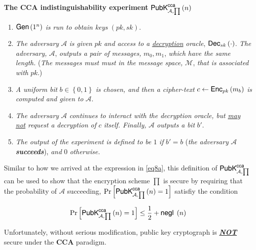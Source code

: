 \documentclass[../CryptoHW3.tex]{subfiles}
\begin{document}
\begin{flushleft}
\textbf{The CCA indistinguishability experiment} $\text{{\fontfamily{phv}\selectfont PubK}}^{\text{{\fontfamily{phv}\selectfont cca}}}_{\mathcal{A}, \prod} \left( n \right)$

\begin{enumerate}
  \item $\text{{\fontfamily{phv}\selectfont Gen}} \left( 1^n \right)$ \emph{is run to obtain keys} $\left( pk, sk \right)$.
  \item \emph{The adversary} $\mathcal{A}$ \emph{is given} $pk$ \emph{and access to a \underline{decryption} oracle}, $\text{{\fontfamily{phv}\selectfont Dec}}_{sk} \left( \cdot \right)$.  \emph{The adversary,} $\mathcal{A}$, \emph{outputs a pair of messages,} $m_0, m_1$, \emph{which have the same length.} (\emph{The messages must must in the message space,} $\mathcal{M}$, \emph{that is associated with} $pk$.)
  \item \emph{A uniform bit} $b \in \left\{ 0, 1 \right\}$ \emph{is chosen, and then a cipher-text} $c \leftarrow \text{{\fontfamily{phv}\selectfont Enc}}_{pk} \left( m_b \right)$ \emph{is computed and given to} $\mathcal{A}$.
  \item \emph{The adversary} $\mathcal{A}$ \emph{continues to interact with the decryption oracle, but \underline{may not} request a decryption of} $c$ \emph{itself.  Finally,} $\mathcal{A}$ \emph{outputs a bit} $b'$.
  \item \emph{The output of the experiment is defined to be} $1$ \emph{if} $b' = b$ (\emph{the adversary} $\mathcal{A}$ \textbf{\emph{succeeds}}), \emph{and} $0$ \emph{otherwise.}
\end{enumerate}

Similar to how we arrived at the expression in \ref{eq8a}, this definition of $\text{{\fontfamily{phv}\selectfont PubK}}^{\text{{\fontfamily{phv}\selectfont cca}}}_{\mathcal{A}, \prod}$ can be used to show that the encryption scheme $\prod$ is secure by requiring that the probability of $\mathcal{A}$ succeeding, $\Pr \left[ \text{{\fontfamily{phv}\selectfont PubK}}^{\text{{\fontfamily{phv}\selectfont cca}}}_{\mathcal{A}, \prod} \left( n \right) = 1 \right]$ satisfiy the condition 

\begin{align}
  \Pr \left[ \text{{\fontfamily{phv}\selectfont PubK}}^{\text{{\fontfamily{phv}\selectfont cca}}}_{\mathcal{A}, \prod} \left( n \right) = 1 \right] \leq \frac{1}{2} +  \text{{\fontfamily{phv}\selectfont negl }} \left( n \right) \label{eq8g}
\end{align}

Unfortunately, without serious modification, public key cryptograph is \textbf{\underline{\emph{NOT}}} secure under the \textbf{CCA} paradigm.
 























\end{flushleft}
\end{document}

